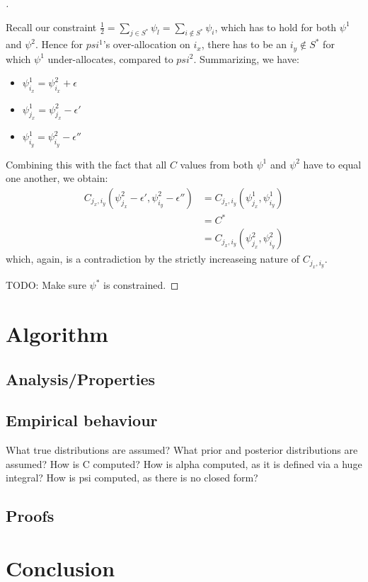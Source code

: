 \begin{proof}[]
\begin{enumerate}[(i)]
\begin{itemize}
      Recall our constraint $\frac{1}{2} = \sum_{j \in S^*} \psi_l = \sum_{i \notin S^*} \psi_i$, which has to hold for both $\psi^1$ and $\psi^2$.
      Hence for $psi^1$'s over-allocation on $i_x$, there has to be an $i_y \notin S^*$ for which $\psi^1$ under-allocates, compared to $psi^2$.
      Summarizing, we have:
      \begin{itemize}
        \item $\psi^1_{i_x} = \psi^2_{i_x} + \epsilon$
        \item $\psi^1_{j_x} = \psi^2_{j_x} - \epsilon'$
        \item $\psi^1_{i_y} = \psi^2_{i_y} - \epsilon''$
      \end{itemize}
      Combining this with the fact that all $C$ values from both $\psi^1$ and $\psi^2$ have to equal one another, we obtain:
      \begin{align}
        C_{j_x, i_y}(\psi^2_{j_x} - \epsilon', \psi^2_{i_y} - \epsilon'') &= C_{j_x, i_y}(\psi^1_{j_x}, \psi^1_{i_y}) \\
        &= C^* \\
        &= C_{j_x, i_y}(\psi^2_{j_x}, \psi^2_{i_y})
      \end{align}
      which, again, is a contradiction by the strictly increaseing nature of $C_{j_x, i_y}$.
    \end{itemize}
  \end{enumerate}

TODO: Make sure $\psi^*$ is constrained.

\end{proof}

\chapter{Algorithm}
\section{Analysis/Properties}
\section{Empirical behaviour}\label{section:empirical_behaviour}
What true distributions are assumed?
What prior and posterior distributions are assumed?
How is C computed?
How is alpha computed, as it is defined via a huge integral?
How is psi computed, as there is no closed form?
\section{Proofs}

\chapter{Conclusion}
